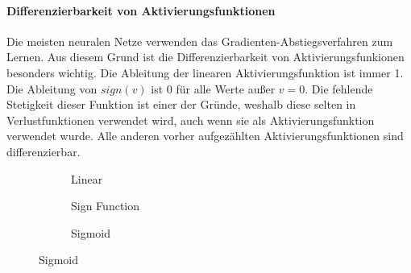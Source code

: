 \paragraph{Differenzierbarkeit von Aktivierungsfunktionen}
Die meisten neuralen Netze verwenden das Gradienten-Abstiegsverfahren zum Lernen. \cite{CA18} Aus diesem Grund ist die Differenzierbarkeit von Aktivierungsfunkionen besonders wichtig. Die Ableitung der linearen Aktivierungsfunktion ist immer 1.
Die Ableitung von $sign(v)$ ist 0 für alle Werte außer $v = 0$. Die fehlende Stetigkeit dieser Funktion ist einer der Gründe, weshalb diese selten in Verlustfunktionen verwendet wird, auch wenn sie als Aktivierungsfunktion verwendet wurde. 
Alle anderen vorher aufgezählten Aktivierungsfunktionen sind differenzierbar. \cite{CA18}

\begin{figure}[htbp]
    \centering
    \begin{subfigure}{0.3\textwidth}
      \centering
      \caption{Linear}
      \label{fig:plot1}
    \end{subfigure}
    \hfill
    \begin{subfigure}{0.3\textwidth}
        \centering
        \caption{Sign Function}
        \label{fig:plot2}
      \end{subfigure}
    \hfill
    \begin{subfigure}{0.3\textwidth}
      \centering
      \caption{Sigmoid}
      \label{fig:plot3}
    \end{subfigure}
  

\end{figure}
